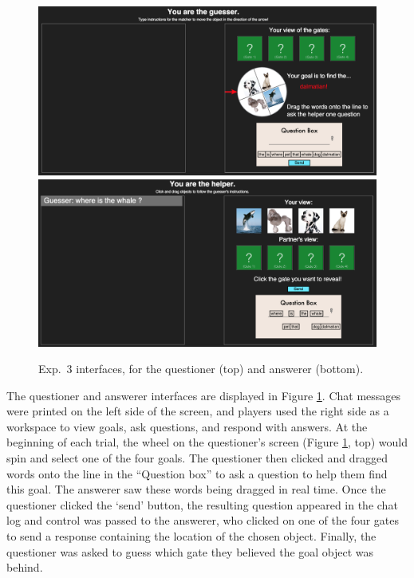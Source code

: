 \documentclass[12pt, floatsintext, man]{apa6}
\begin{document}
	\begin{figure}[t!]
\begin{center}
\includegraphics[scale = .3]{Exp3GuesserView}
\includegraphics[scale = .3]{Exp3HelperView}
\end{center}
\vspace{-.5cm}
\caption{Exp.~3 interfaces, for the questioner (top) and answerer (bottom).}
\vspace{-.1cm}
\label{fig:exp3views}
\end{figure}

The questioner and answerer interfaces are displayed in Figure \ref{fig:exp3views}. Chat messages were printed on the left side of the screen, and players used the right side as a workspace to view goals, ask questions, and respond with answers. At the beginning of each trial, the wheel on the questioner's screen (Figure \ref{fig:exp3views}, top) would spin and select one of the four goals. The questioner then clicked and dragged words onto the line in the ``Question box'' to ask a question to help them find this goal. The answerer saw these words being dragged in real time. Once the questioner clicked the `send' button, the resulting question appeared in the chat log and control was passed to the answerer, who clicked on one of the four gates to send a response containing the location of the chosen object. Finally, the questioner was asked to guess which gate they believed the goal object was behind. 
\end{document}
